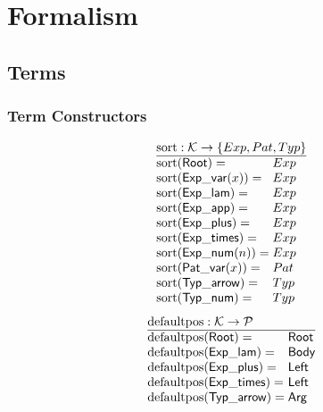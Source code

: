 \section{Formalism}


\subsection{Terms}

\figureTermSyntaxContent


\subsubsection{Term Constructors}

\[
  \arraycolsep=0pt
  \begin{array}{ll}
    \multicolumn{2}{l}{\sortOp : \K \to \SetOf{Exp, Pat, Typ}} \\
    \hline
    \sort{\Root}={} & Exp \\
    \sort{\ExpVar(x)}={} & Exp \\
    \sort{\ExpLam}={} & Exp \\
    \sort{\ExpApp}={} & Exp \\
    \sort{\ExpPlus}={} & Exp \\
    \sort{\ExpTimes}={} & Exp \\
    \sort{\ExpNum(n)}={} & Exp \\
    \sort{\PatVar(x)}={} & Pat \\
    \sort{\TypArrow}={} & Typ \\
    \sort{\TypNum}={} & Typ \\
  \end{array}
\]
%
\figureArityContent
%
\[
  \arraycolsep=0pt
  \begin{array}{ll}
    \multicolumn{2}{l}{\defaultposOp : \K \to \P} \\
    \hline
    \defaultpos{\Root}={} & \Root \\
    \defaultpos{\ExpLam}={} & \LamBody \\
    \defaultpos{\ExpPlus}={} & \PlusLeft \\
    \defaultpos{\ExpTimes}={} & \TimesLeft \\
    \defaultpos{\TypArrow}={} & \ArrowArg \\
  \end{array}
\]

